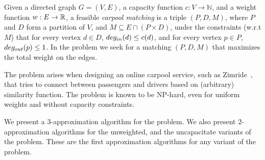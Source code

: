 Given a directed graph $G = (V, E)$,
a capacity function $ c: V \rightarrow \mathbb{N} $,
and a weight function $w : E \rightarrow \mathbb{R} $,
a feasible \emph{carpool matching} is a triple 
$(P, D, M)$, where $P$ and $D$ form a partition of $V$, and 
$M \subseteq E \cap (P \times D)$,
under the constraints (w.r.t $M$) that for every vertex $d \in D$, 
$deg_{in}(d) \leq c(d)$, 
and for every vertex $p \in P$, $deg_{out}(p) \leq 1$.
In the \textsc{\CARPOOL{}} problem we seek for a matching $(P, D, M)$ that maximizes the
total weight on the edges.

The problem arises when designing an online carpool service, 
such as Zimride~\cite{zimride}, 
that tries to connect between passengers and drivers based on (arbitrary) similarity function.
The problem is known to be NP-hard, 
even for uniform weights and without capacity constraints.

We present a $3$-approximation algorithm for the \CARPOOL{} problem.
We also present $2$-approximation algorithms for the 
unweighted, and the uncapacitate variants of the problem.
These are the first approximation algorithms for any variant of the problem.
